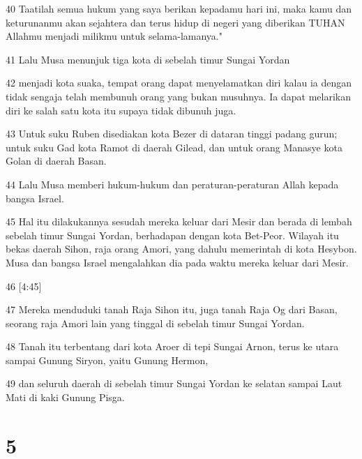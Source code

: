 \par 40 Taatilah semua hukum yang saya berikan kepadamu hari ini, maka kamu dan keturunanmu akan sejahtera dan terus hidup di negeri yang diberikan TUHAN Allahmu menjadi milikmu untuk selama-lamanya."
\par 41 Lalu Musa menunjuk tiga kota di sebelah timur Sungai Yordan
\par 42 menjadi kota suaka, tempat orang dapat menyelamatkan diri kalau ia dengan tidak sengaja telah membunuh orang yang bukan musuhnya. Ia dapat melarikan diri ke salah satu kota itu supaya tidak dibunuh juga.
\par 43 Untuk suku Ruben disediakan kota Bezer di dataran tinggi padang gurun; untuk suku Gad kota Ramot di daerah Gilead, dan untuk orang Manasye kota Golan di daerah Basan.
\par 44 Lalu Musa memberi hukum-hukum dan peraturan-peraturan Allah kepada bangsa Israel.
\par 45 Hal itu dilakukannya sesudah mereka keluar dari Mesir dan berada di lembah sebelah timur Sungai Yordan, berhadapan dengan kota Bet-Peor. Wilayah itu bekas daerah Sihon, raja orang Amori, yang dahulu memerintah di kota Hesybon. Musa dan bangsa Israel mengalahkan dia pada waktu mereka keluar dari Mesir.
\par 46 [4:45]
\par 47 Mereka menduduki tanah Raja Sihon itu, juga tanah Raja Og dari Basan, seorang raja Amori lain yang tinggal di sebelah timur Sungai Yordan.
\par 48 Tanah itu terbentang dari kota Aroer di tepi Sungai Arnon, terus ke utara sampai Gunung Siryon, yaitu Gunung Hermon,
\par 49 dan seluruh daerah di sebelah timur Sungai Yordan ke selatan sampai Laut Mati di kaki Gunung Pisga.

\chapter{5}

